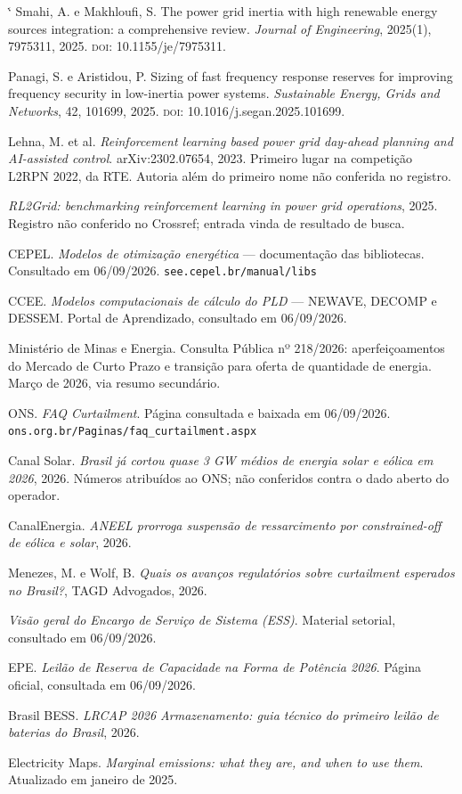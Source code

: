 \documentclass[10pt,a4paper,oneside]{book}
\makeatletter
\renewenvironment{thebibliography}[1]
  {\list{\@biblabel{\@arabic\c@enumiv}}%
     {\settowidth\labelwidth{\@biblabel{#1}}%
      \leftmargin\labelwidth \advance\leftmargin\labelsep
      \usecounter{enumiv}\let\p@enumiv\@empty
      \renewcommand\theenumiv{\@arabic\c@enumiv}}%
   \sloppy\clubpenalty4000 \@clubpenalty\clubpenalty
   \widowpenalty4000 \sfcode`\.\@m}
  {\endlist}
\makeatother
\begin{document}
{\begin{thebibliography}{99}
 Smahi, A. e Makhloufi, S. The power grid inertia with high
  renewable energy sources integration: a comprehensive review. \emph{Journal
  of Engineering}, 2025(1), 7975311, 2025. \textsc{doi}: 10.1155/je/7975311.

 Panagi, S. e Aristidou, P. Sizing of fast frequency
  response reserves for improving frequency security in low-inertia power
  systems. \emph{Sustainable Energy, Grids and Networks}, 42, 101699, 2025.
  \textsc{doi}: 10.1016/j.segan.2025.101699.

 Lehna, M. et al. \emph{Reinforcement learning based power
  grid day-ahead planning and AI-assisted control}. arXiv:2302.07654, 2023.
  Primeiro lugar na competição L2RPN 2022, da RTE. Autoria além do primeiro
  nome não conferida no registro.

 \emph{RL2Grid: benchmarking reinforcement learning in
  power grid operations}, 2025. Registro não conferido no Crossref; entrada
  vinda de resultado de busca.

 CEPEL. \emph{Modelos de otimização energética} ---
  documentação das bibliotecas. Consultado em 06/09/2026.
  \texttt{see.cepel.br/manual/libs}

 CCEE. \emph{Modelos computacionais de cálculo do PLD}
  --- NEWAVE, DECOMP e DESSEM. Portal de Aprendizado, consultado em 06/09/2026.

 Ministério de Minas e Energia. Consulta Pública nº 218/2026:
  aperfeiçoamentos do Mercado de Curto Prazo e transição para oferta de
  quantidade de energia. Março de 2026, via resumo secundário.

 ONS. \emph{FAQ Curtailment}. Página consultada e baixada em
  06/09/2026. \texttt{ons.org.br/Paginas/faq\_curtailment.aspx}

 Canal Solar. \emph{Brasil já cortou quase 3 GW médios
  de energia solar e eólica em 2026}, 2026. Números atribuídos ao ONS; não
  conferidos contra o dado aberto do operador.

 CanalEnergia. \emph{ANEEL prorroga suspensão de
  ressarcimento por constrained-off de eólica e solar}, 2026.

 Menezes, M. e Wolf, B. \emph{Quais os avanços regulatórios
  sobre curtailment esperados no Brasil?}, TAGD Advogados, 2026.

 \emph{Visão geral do Encargo de Serviço de Sistema (ESS)}.
  Material setorial, consultado em 06/09/2026.

 EPE. \emph{Leilão de Reserva de Capacidade na Forma de
  Potência 2026}. Página oficial, consultada em 06/09/2026.

 Brasil BESS. \emph{LRCAP 2026 Armazenamento: guia técnico do
  primeiro leilão de baterias do Brasil}, 2026.

 Electricity Maps. \emph{Marginal emissions: what they are,
  and when to use them}. Atualizado em janeiro de 2025.

\end{thebibliography}
}
\end{document}

